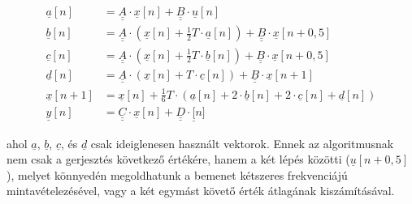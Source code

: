 \begin{equation}
\begin{align*}
\underline{a}[n] &= \underline{\underline{A}}\cdot \underline{x}[n] + \underline{\underline{B}}\cdot{}\underline{u}[n] \\[0.3em]
\underline{b}[n] &= \underline{\underline{A}}\cdot (\underline{x}[n] + \frac{1}{2}T \cdot \underline{a}[n]) + \underline{\underline{B}}\cdot{}\underline{x}[n + 0,5] \\[0.3em]
\underline{c}[n] &= \underline{\underline{A}}\cdot (\underline{x}[n] + \frac{1}{2}T \cdot \underline{b}[n]) + \underline{\underline{B}}\cdot{}\underline{x}[n + 0,5] \\[0.3em]
\underline{d}[n] &= \underline{\underline{A}}\cdot (\underline{x}[n] + T \cdot \underline{c}[n]) + \underline{\underline{B}}\cdot{}\underline{x}[n + 1] \\[0.3em]
\underline{x}[n+1] &= \underline{x}[n] + \frac{1}{6}T \cdot{} (\underline{a}[n] + 2 \cdot{} \underline{b}[n] + 2 \cdot{} \underline{c}[n] + \underline{d}[n]) \\[0.3em]
\underline{y}[n] &= \underline{\underline{C}} \cdot{} \underline{x}[n] + \underline{\underline{D}} \cdot \underline[n]
\end{align*} 
\end{equation}

ahol $\underline{a}$, $\underline{b}$, $\underline{c}$, és $\underline{d}$ csak ideiglenesen használt vektorok. Ennek az algoritmusnak nem csak a gerjesztés következő értékére, hanem a két lépés közötti ($\underline{u}[n+0,5]$), melyet könnyedén megoldhatunk a bemenet kétszeres frekvenciájú mintavételezésével, vagy a két egymást követő érték átlagának kiszámításával.